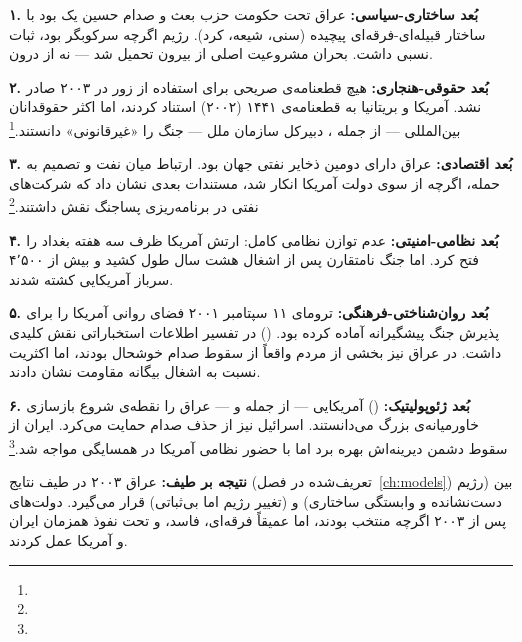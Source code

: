 \begin{tcolorbox}[casebox, title={مطالعه‌ی موردی: عراق ۲۰۰۳ — تحلیل شش‌وجهی}]

\textbf{۱. بُعد ساختاری-سیاسی:}
عراق تحت حکومت حزب بعث و صدام حسین یک  بود با ساختار قبیله‌ای-فرقه‌ای پیچیده (سنی، شیعه، کرد). رژیم اگرچه سرکوبگر بود، ثبات نسبی داشت. بحران مشروعیت اصلی از بیرون تحمیل شد — نه از درون.

\textbf{۲. بُعد حقوقی-هنجاری:}
هیچ قطعنامه‌ی صریحی برای استفاده از زور در ۲۰۰۳ صادر نشد. آمریکا و بریتانیا به قطعنامه‌ی ۱۴۴۱ (۲۰۰۲) استناد کردند، اما اکثر حقوقدانان بین‌المللی — از جمله ، دبیرکل سازمان ملل — جنگ را «غیرقانونی» دانستند.\footnote{}

\textbf{۳. بُعد اقتصادی:}
عراق دارای دومین ذخایر نفتی جهان بود. ارتباط میان نفت و تصمیم به حمله، اگرچه از سوی دولت آمریکا انکار شد، مستندات بعدی نشان داد که شرکت‌های نفتی در برنامه‌ریزی پساجنگ نقش داشتند.\footnote{}

\textbf{۴. بُعد نظامی-امنیتی:}
عدم توازن نظامی کامل: ارتش آمریکا ظرف سه هفته بغداد را فتح کرد. اما جنگ نامتقارن پس از اشغال هشت سال طول کشید و بیش از ۴٬۵۰۰ سرباز آمریکایی کشته شدند.

\textbf{۵. بُعد روان‌شناختی-فرهنگی:}
ترومای ۱۱ سپتامبر ۲۰۰۱ فضای روانی آمریکا را برای پذیرش جنگ پیشگیرانه آماده کرده بود.  () در تفسیر اطلاعات استخباراتی نقش کلیدی داشت. در عراق نیز بخشی از مردم واقعاً از سقوط صدام خوشحال بودند، اما اکثریت نسبت به اشغال بیگانه مقاومت نشان دادند.

\textbf{۶. بُعد ژئوپولیتیک:}
 () آمریکایی — از جمله  و  — عراق را نقطه‌ی شروع بازسازی خاورمیانه‌ی بزرگ می‌دانستند. اسرائیل نیز از حذف صدام حمایت می‌کرد. ایران از سقوط دشمن دیرینه‌اش بهره برد اما با حضور نظامی آمریکا در همسایگی مواجه شد.\footnote{}
\end{tcolorbox}

\textbf{نتیجه بر طیف:} عراق ۲۰۰۳ در طیف نتایج (تعریف‌شده در فصل~\ref{ch:models}) بین  (رژیم دست‌نشانده و وابستگی ساختاری) و  (تغییر رژیم اما بی‌ثباتی) قرار می‌گیرد. دولت‌های پس از ۲۰۰۳ اگرچه منتخب بودند، اما عمیقاً فرقه‌ای، فاسد، و تحت نفوذ همزمان ایران و آمریکا عمل کردند.


